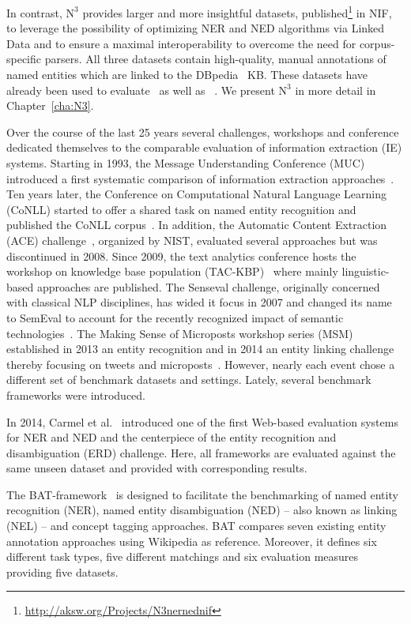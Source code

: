 In contrast,  $\mbox{N}^3$ provides larger and more insightful datasets, published\footnote{\url{http://aksw.org/Projects/N3nernednif}} in NIF, to leverage the possibility of optimizing NER and NED algorithms via Linked Data and to ensure a maximal interoperability to overcome the need for corpus-specific parsers. 
All three datasets contain high-quality, manual annotations of named entities which are linked to the DBpedia~\cite{dbpedia-swj} \ac{KB}.
These datasets have already been used to evaluate~\cite{AIDA,spotlight} as well as ~\cite{GER+13,agdistis_iswc,GERBIL}.
We present $\mbox{N}^3$ in more detail in Chapter~\ref{cha:N3}.


\bigskip

Over the course of the last 25 years several challenges, workshops and conference dedicated themselves to the comparable evaluation of information extraction (IE) systems. 
Starting in 1993, the Message Understanding Conference (MUC) introduced a first systematic comparison of information extraction approaches~\cite{Sundheim:1993:TIE:1072017.1072023}.
Ten years later, the Conference on Computational Natural Language Learning (CoNLL) started to offer a shared task on named entity recognition and published the CoNLL corpus~\cite{conll2003}.
In addition, the Automatic Content Extraction (ACE) challenge~\cite{doddington2004automatic}, organized by NIST, evaluated several approaches but was discontinued in 2008. 
Since 2009, the text analytics conference hosts the workshop on knowledge base population (TAC-KBP)~\cite{mcnamee2009overview} where mainly linguistic-based approaches are published.
The Senseval challenge, originally concerned with classical NLP disciplines, has wided it focus in 2007 and changed its name to SemEval to account for the recently recognized impact of semantic technologies~\cite{kilgarri1998senseval}.
The Making Sense of Microposts workshop series (MSM) established in 2013 an entity recognition and in 2014 an entity linking challenge thereby focusing on tweets and microposts~\cite{MSM2014}.
However, nearly each event chose a different set of benchmark datasets and settings. 
Lately, several benchmark frameworks were introduced.

In 2014, Carmel et al.~\cite{ERD2014} introduced one of the first Web-based evaluation systems for NER and NED and the centerpiece of the entity recognition and disambiguation (ERD) challenge. Here, all frameworks are evaluated against the same unseen dataset and provided with corresponding results. 

The BAT-framework~\cite{cornolti} is designed to facilitate the benchmarking of named entity recognition (NER), named entity disambiguation (NED) -- also known as linking (NEL) -- and concept tagging approaches.
BAT compares seven existing entity annotation approaches using Wikipedia as reference.
Moreover, it defines six different task types, five different matchings and six evaluation measures providing five datasets.

